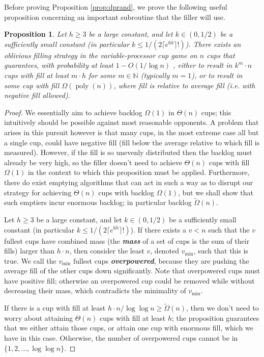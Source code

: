 \documentclass[twocolumn]{article}[11pt]
\newcommand{\defn}[1]{{\textit{\textbf{\boldmath #1}}}}
\DeclareMathOperator{\poly}{\text{poly}}
\newtheorem{proposition}{Proposition}
\begin{document}
Before proving Proposition \ref{prop:dprand}, we prove the following useful
proposition concerning an important subroutine that the filler will use.
\begin{proposition}
  \label{prop:tail}
  Let $h \ge 3$ be a large constant, and let $k \in (0,1/2)$ be a sufficiently small
  constant (in particular $k\le 1/ (2\lceil e^{6h} \rceil!)$). There exists an oblivious
  filling strategy in the variable-processor cup game on $n$ cups that
  guarantees, with probability at least $1-O(1/\log n)$%
  , either to result in
  $k^m\cdot n$ cups with fill at least $m\cdot h$ for some $m \in \mathbb{N}$
  (typically $m=1$), or to result in some cup with fill $\Omega(\poly(n))$,
  where fill is relative to average fill (i.e. with negative fill allowed).
\end{proposition}
\begin{proof}
  We essentially aim to achieve backlog $\Omega(1)$ in $\Theta(n)$ cups; this
  intuitively should be possible against most reasonable opponents.  A problem
  that arises in this pursuit however is that many cups, in the most extreme
  case all but a single cup, could have negative fill (fill below the average
  relative to which fill is measured). However, if the fill is so unevenly
  distributed then the backlog must already be very high, so the filler doesn't
  need to achieve $\Theta(n)$ cups with fill $\Omega(1)$ in the context to
  which this proposition must be applied. Furthermore, there do exist emptying
  algorithms that can act in such a way as to disrupt our strategy for
  achieving $\Theta(n)$ cups with backlog $\Omega(1)$, but we shall show that
  such emptiers incur enormous backlog; in particular backlog
  $\tilde{\Omega}(n)$.

  Let $h \ge 3$ be a large constant, and let $k \in (0,1/2)$ be a sufficiently small
  constant (in particular $k\le 1/ (2\lceil e^{6h} \rceil!)$). If there exists
  a $v<n$ such that the $v$ fullest cups have combined mass (the \defn{mass} of
  a set of cups is the sum of their fills) larger than $h\cdot n$, then
  consider the least $v$, denoted $v_{\min}$, such that this is true. We call
  the $v_{\min}$ fullest cups \defn{overpowered}, because they are pushing the
  average fill of the other cups down significantly. Note that overpowered cups
  must have positive fill; otherwise an overpowered cup could be removed while
  without decreasing their mass, which contradicts the minimality of $v_{\min}$.

  If there is a cup with fill at least $h\cdot n / \log\log n \ge
  \tilde{\Omega}(n)$, then we don't need to worry about attaining $\Theta(n)$
  cups with fill at least $h$; the proposition guarantees that we either attain
  those cups, or attain one cup with enormous fill, which we have in this case.
  Otherwise, the number of overpowered cups cannot be in $\{1, 2, \ldots, \log \log n\}$.


\end{proof}
\end{document}
